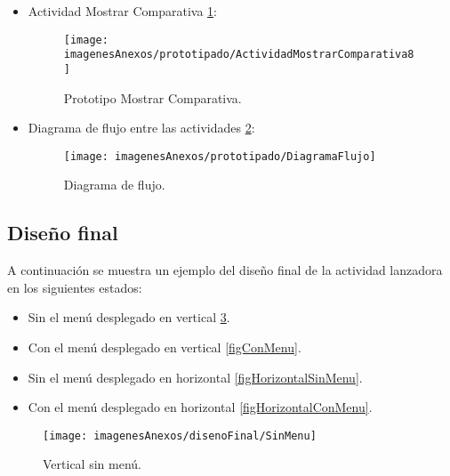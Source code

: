 \begin{itemize}
	
	\item Actividad Mostrar Comparativa \ref{figActividadMostrarComparativa8}:
	\begin{figure}[h]
    	\begin{center}%
        	\begin{center}%
          	\texttt{[image: imagenesAnexos/prototipado/ActividadMostrarComparativa8]}%
          	\caption{Prototipo Mostrar Comparativa.}%
          	\label{figActividadMostrarComparativa8}%
        	\end{center}%
  		\end{center}%
	\end{figure}%
	\clearpage
		
	
	\item Diagrama de flujo entre las actividades \ref{figDiagramaFlujo}:
	\begin{figure}[h]
    	\begin{center}%
        	\begin{center}%
          	\texttt{[image: imagenesAnexos/prototipado/DiagramaFlujo]}%
          	\caption{Diagrama de flujo.}%
          	\label{figDiagramaFlujo}%
        	\end{center}%
  		\end{center}%
	\end{figure}%
\end{itemize}

\subsection{Diseño final}

A continuación se muestra un ejemplo del diseño final de la actividad lanzadora en los siguientes estados:
\begin{itemize}
	\item Sin el menú desplegado en vertical \ref{figSinMenu}.
	\item Con el menú desplegado en vertical \ref{figConMenu}.
	\item Sin el menú desplegado en horizontal \ref{figHorizontalSinMenu}.
	\item Con el menú desplegado en horizontal \ref{figHorizontalConMenu}.
\end{itemize}

	\begin{figure}[h]
    	\begin{center}%
        	\begin{center}%
          	\texttt{[image: imagenesAnexos/disenoFinal/SinMenu]}%
          	\caption{Vertical sin menú.}%
          	\label{figSinMenu}%
        	\end{center}%
  		\end{center}%
	\end{figure}%
	
